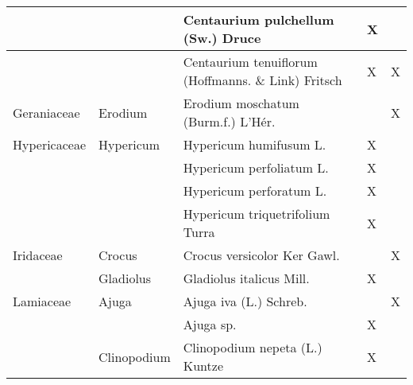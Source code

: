 \documentclass[main.tex]{subfiles}
\begin{document}
\begin{table}[!ht]
\begin{tabular}[\footnotesize]{|p{2.4cm}|p{1.9cm}|p{5.8cm}|p{1.1cm}|p{1cm}|}
        ~ & ~ & Centaurium pulchellum (Sw.) Druce & X & ~ \\ \hline
        ~ & ~ & Centaurium tenuiflorum (Hoffmanns. \& Link) Fritsch & X & X \\ \hline
        Geraniaceae & Erodium & Erodium moschatum (Burm.f.) L'Hér. & ~ & X \\ \hline
        Hypericaceae & Hypericum & Hypericum humifusum L. & X & ~ \\ \hline
        ~ & ~ & Hypericum perfoliatum L. & X & ~ \\ \hline
        ~ & ~ & Hypericum perforatum L. & X & ~ \\ \hline
        ~ & ~ & Hypericum triquetrifolium Turra & X & ~ \\ \hline
        Iridaceae & Crocus & Crocus versicolor Ker Gawl. & ~ & X \\ \hline
        ~ & Gladiolus & Gladiolus italicus Mill. & X & ~ \\ \hline
        Lamiaceae & Ajuga & Ajuga iva (L.) Schreb. & ~ & X \\ \hline
        ~ & ~ & Ajuga sp. & X & ~ \\ \hline
        ~ & Clinopodium & Clinopodium nepeta (L.) Kuntze & X & ~ \\ \hline
       \end{tabular}
    \end{table}
    
    \clearpage
        
\end{document}
